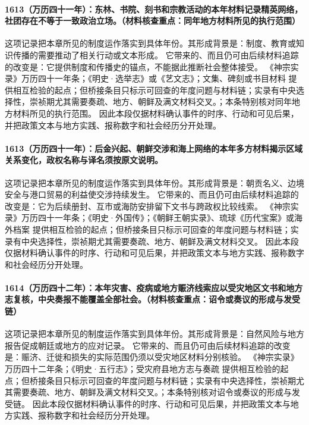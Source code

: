 \paragraph{1613（万历四十一年）：东林、书院、刻书和宗教活动的本年材料记录精英网络，社团存在不等于一致政治立场。（材料核查重点：同年地方材料所见的执行范围）} 这项记录把本章所见的制度运作落实到具体年份。其形成背景是：制度、教育或知识传播的需要推动了相关行动或文本形成。 它带来的、而且仍可由后续材料追踪的改变是：它提供制度和传播史的锚点，不能据此推断社会整体接受。 《神宗实录》万历四十一年条；《明史·选举志》或《艺文志》；文集、碑刻或书目材料 提供相互检验的起点；但桥接条目只标示可回查的年度问题与材料链；实录有中央选择性，崇祯期尤其需要奏疏、地方、朝鲜及满文材料交叉。；本条特别核对同年地方材料所见的执行范围。 因此本段仅据材料确认事件的时序、行动和可见后果，并把政策文本与地方实践、报称数字和社会经历分开处理。

\paragraph{1613（万历四十一年）：后金兴起、朝鲜交涉和海上网络的本年多方材料揭示区域关系变化，政权名称与译名须按原文说明。} 这项记录把本章所见的制度运作落实到具体年份。其形成背景是：朝贡名义、边境安全与港口贸易的利益使交涉持续发生。 它带来的、而且仍可由后续材料追踪的改变是：它为后续册封、互市或海防安排留下文书与跨政权比较线索。 《神宗实录》万历四十一年条；《明史·外国传》；《朝鲜王朝实录》、琉球《历代宝案》或海外档案 提供相互检验的起点；但桥接条目只标示可回查的年度问题与材料链；实录有中央选择性，崇祯期尤其需要奏疏、地方、朝鲜及满文材料交叉。 因此本段仅据材料确认事件的时序、行动和可见后果，并把政策文本与地方实践、报称数字和社会经历分开处理。

\paragraph{1614（万历四十二年）：本年灾害、疫病或地方赈济线索应以受灾地区文书和地方志复核，中央奏报不能覆盖全部社会。（材料核查重点：诏令或奏议的形成与发受链）} 这项记录把本章所见的制度运作落实到具体年份。其形成背景是：自然风险与地方报告促成朝廷或地方的应对记录。 它带来的、而且仍可由后续材料追踪的改变是：赈济、迁徙和损失的实际范围仍须以受灾地区材料分别核验。 《神宗实录》万历四十二年条；《明史·五行志》；受灾府县地方志与奏疏 提供相互检验的起点；但桥接条目只标示可回查的年度问题与材料链；实录有中央选择性，崇祯期尤其需要奏疏、地方、朝鲜及满文材料交叉。；本条特别核对诏令或奏议的形成与发受链。 因此本段仅据材料确认事件的时序、行动和可见后果，并把政策文本与地方实践、报称数字和社会经历分开处理。

